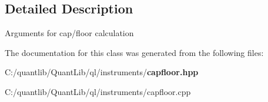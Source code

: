 \subsection{Detailed Description}
Arguments for cap/floor calculation 

The documentation for this class was generated from the following files\+:\begin{DoxyCompactItemize}
\item 
C\+:/quantlib/\+Quant\+Lib/ql/instruments/{\bf capfloor.\+hpp}\item 
C\+:/quantlib/\+Quant\+Lib/ql/instruments/capfloor.\+cpp\end{DoxyCompactItemize}
